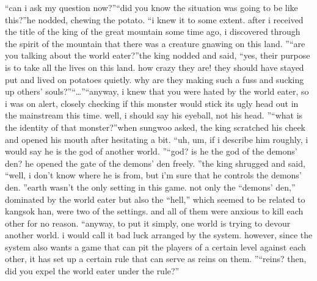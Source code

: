 “can i ask my question now?”“did you know the situation was going to be like this?”he nodded, chewing the potato.
“i knew it to some extent.
 after i received the title of the king of the great mountain some time ago, i discovered through the spirit of the mountain that there was a creature gnawing on this land.
”“are you talking about the world eater?”the king nodded and said, “yes, their purpose is to take all the lives on this land.
 how crazy they are! they should have stayed put and lived on potatoes quietly.
 why are they making such a fuss and sucking up others’ souls?”“…”“anyway, i knew that you were hated by the world eater, so i was on alert, closely checking if this monster would stick its ugly head out in the mainstream this time.
 well, i should say his eyeball, not his head.
”“what is the identity of that monster?”when sungwoo asked, the king scratched his cheek and opened his mouth after hesitating a bit.
“uh, um, if i describe him roughly, i would say he is the god of another world.
”“god? is he the god of the demons’ den? he opened the gate of the demons’ den freely.
”the king shrugged and said, “well, i don’t know where he is from, but i’m sure that he controls the demons’ den.
”earth wasn’t the only setting in this game.
 not only the “demons’ den,” dominated by the world eater but also the “hell,” which seemed to be related to kangsok han, were two of the settings.
and all of them were anxious to kill each other for no reason.
“anyway, to put it simply, one world is trying to devour another world.
 i would call it bad luck arranged by the system.
 however, since the system also wants a game that can pit the players of a certain level against each other, it has set up a certain rule that can serve as reins on them.
”“reins? then, did you expel the world eater under the rule?”

 